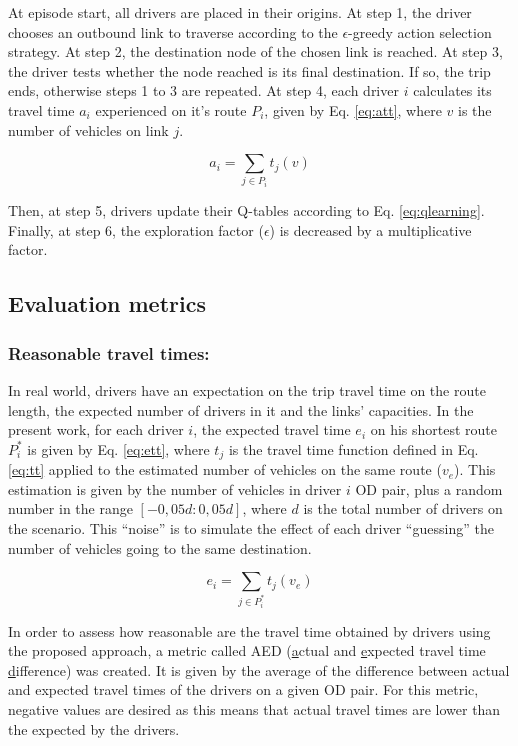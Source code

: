 \documentclass{RITA}
\newcommand{\route}[1]{\ensuremath{P_#1}}	%
\newcommand{\optRoute}[1]{\ensuremath{P_#1^*}}	%
\newcommand{\travTime}{\ensuremath{t_j}} 	%
\newcommand{\veh}{\ensuremath{v}}		%
\newcommand{\ett}[1]{\ensuremath{e_#1}}		%
\newcommand{\expVeh}{\ensuremath{v_e}}		%
\newcommand{\att}[1]{\ensuremath{a_#1}}		%
\begin{document}
At episode start, all drivers are placed in their origins. At step 1, the driver chooses an outbound link to traverse according to the $\epsilon$-greedy action selection strategy. At step 2, the destination node of the chosen link is reached. At step 3, the driver tests whether the node reached is its final destination. If so, the trip ends, otherwise steps 1 to 3 are repeated. At step 4, each driver $i$ calculates its travel time $\att{i}$ experienced on it's route $\route{i}$, given by Eq. \eqref{eq:att}, where $\veh$ is the number of vehicles on link $j$.

\begin{equation}
\label{eq:att}
\att{i} = \sum_{j \in \route{i}} \travTime(\veh)
\end{equation}

Then, at step 5, drivers update their Q-tables according to Eq. \eqref{eq:qlearning}. Finally, at step 6, the exploration factor ($\epsilon$) is decreased by a multiplicative factor.

\subsection{Evaluation metrics}

\subsubsection{Reasonable travel times:}
In real world, drivers have an expectation on the trip travel time on the route length, the expected number of drivers in it and the links' capacities. In the present work, for each driver $i$, the expected travel time $\ett{i}$ on his shortest route \optRoute{i} is given by Eq. \eqref{eq:ett}, where $\travTime$ is the travel time function defined in Eq. \eqref{eq:tt} applied to the estimated number of vehicles on the same route ($\expVeh$). This estimation is given by the number of vehicles in driver $i$ OD pair, plus a random number in the range $[-0,05d:0,05d]$, where $d$ is the total number of drivers on the scenario. This ``noise'' is to simulate the effect of each driver ``guessing'' the number of vehicles going to the same destination.

\begin{equation}
\label{eq:ett}
\ett{i} = \sum_{j \in \optRoute{i}}\travTime(\expVeh)
\end{equation}

In order to assess how reasonable are the travel time obtained by drivers using the proposed approach, a metric called AED (\underline{a}ctual and \underline{e}xpected travel time \underline{d}ifference) was created. It is given by the average of the difference between actual and expected travel times of the drivers on a given OD pair. For this metric, negative values are desired as this means that actual travel times are lower than the expected by the drivers.
\end{document}
